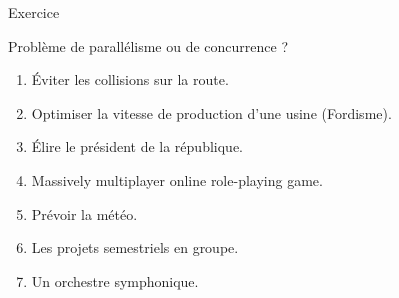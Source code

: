 
\begingroup

\begin{frame}{Exercice}

  \begin{alertblock}{Problème de parallélisme ou de concurrence ?}
    \begin{enumerate} 
    \item Éviter les collisions sur la route.
    \item Optimiser la vitesse de production d'une usine (Fordisme).
    \item Élire le président de la république.
    \item Massively multiplayer online role-playing game.
    \item Prévoir la météo.
    \item Les projets semestriels en groupe.
    \item Un orchestre symphonique.
    \end{enumerate} 
  \end{alertblock}

\end{frame}

\endgroup
\endinput
